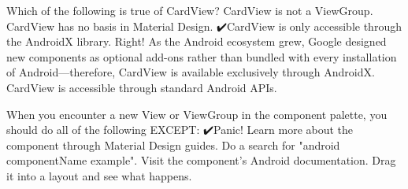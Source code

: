         Which of the following is true of CardView?
            CardView is not a ViewGroup.
            CardView has no basis in Material Design.
            ✔️CardView is only accessible through the AndroidX library.
                Right! As the Android ecosystem grew, Google designed new components as optional add-ons rather than bundled with every installation of Android—therefore, CardView is available exclusively through AndroidX.
            CardView is accessible through standard Android APIs.

        When you encounter a new View or ViewGroup in the component palette, you should do all of the following EXCEPT:
            ✔️Panic!
            Learn more about the component through Material Design guides.
            Do a search for "android componentName example".
            Visit the component’s Android documentation.
            Drag it into a layout and see what happens.